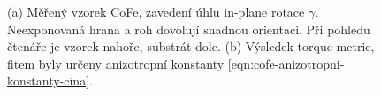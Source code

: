 \begin{figure}[htbp]
    \centering
    
    \caption{(a) Měřený vzorek CoFe, zavedení úhlu in-plane rotace $\gamma$. Neexponovaná hrana a roh dovolují snadnou orientaci. Při pohledu čtenáře je vzorek nahoře, substrát dole. (b) Výsledek torque-metrie, fitem byly určeny anizotropní konstanty \eqref{eqn:cofe-anizotropni-konstanty-cina}. \cite{wuUstniSdeleni}}
    \label{fig:vzorek-cofe}
\end{figure}
